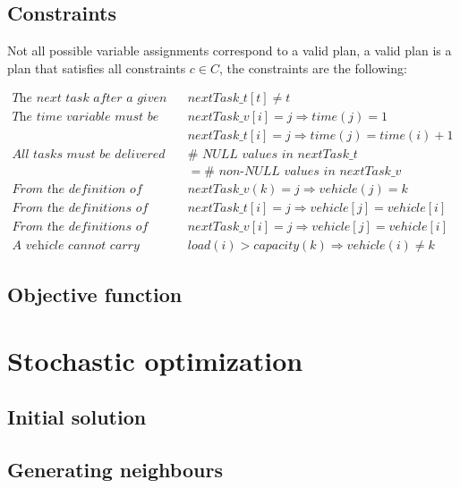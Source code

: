 \documentclass[11pt]{article}
\begin{document}
\subsection{Constraints}
Not all possible variable assignments correspond to a valid plan, a valid plan is a plan that satisfies all constraints $c\in C$, the constraints are the following:

\begin{align*}
    \textit{The next task after a given task t cannot be itself} 
    && nextTask\_t[t] \neq t \\
    \textit{The time variable must be coherent} 
    && nextTask\_v[i] = j \Rightarrow time(j) = 1 \\
    \textit{} && nextTask\_t[i] = j \Rightarrow time(j) = time(i)+1 \\
    \textit{All tasks must be delivered} && \#\textit{ NULL values in nextTask\_t}\\ && = \#\textit{ non-NULL values in nextTask\_v} \\
    \textit{From the definition of vehicle} && nextTask\_v(k) = j \Rightarrow vehicle(j) = k \\
    \textit{From the definitions of nextTask\_t and vehicle} && nextTask\_t[i] = j \Rightarrow vehicle[j] = vehicle[i] \\
    \textit{From the definitions of nextTask\_v and vehicle} && nextTask\_v[i] = j \Rightarrow vehicle[j] = vehicle[i] \\
    \textit{A vehicle cannot carry more than it's capacity} && load(i) > capacity(k) \Rightarrow vehicle(i) \neq k
\end{align*}

\subsection{Objective function}


\section{Stochastic optimization}

\subsection{Initial solution}

\subsection{Generating neighbours}
\end{document}
